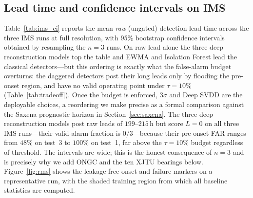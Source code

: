 \documentclass[journal]{IEEEtran}
\begin{document}
\subsection{Lead time and confidence intervals on IMS}
Table~\ref{tab:ims_ci} reports the mean \emph{raw} (ungated) detection lead time
across the three IMS runs at full resolution, with 95\% bootstrap confidence
intervals obtained by resampling the $n{=}3$ runs. On raw lead alone the three deep
reconstruction models top the table and EWMA and Isolation Forest lead the
classical detectors---but this ordering is exactly what the false-alarm budget
overturns: the daggered detectors post their long leads only by flooding the
pre-onset region, and have no valid operating point under $\tau{=}10\%$
(Table~\ref{tab:tradeoff}). Once the budget is enforced, 3$\sigma$ and Deep SVDD are
the deployable choices, a reordering we make precise as a formal comparison against
the Saxena prognostic horizon in Section~\ref{sec:saxena}. The three deep
reconstruction models post raw leads of $199$--$215$\,h but score $L{=}0$ on all three
IMS runs---their valid-alarm fraction is $0/3$---because their pre-onset FAR ranges
from $48\%$ on test~3 to $100\%$ on test~1, far above the $\tau{=}10\%$ budget
regardless of threshold. The intervals are wide;
this
is the honest consequence of $n{=}3$ and is precisely why we add ONGC and the
ten XJTU bearings below. Figure~\ref{fig:rms} shows the leakage-free onset and
failure markers on a representative run, with the shaded training region from
which all baseline statistics are computed.
\end{document}
